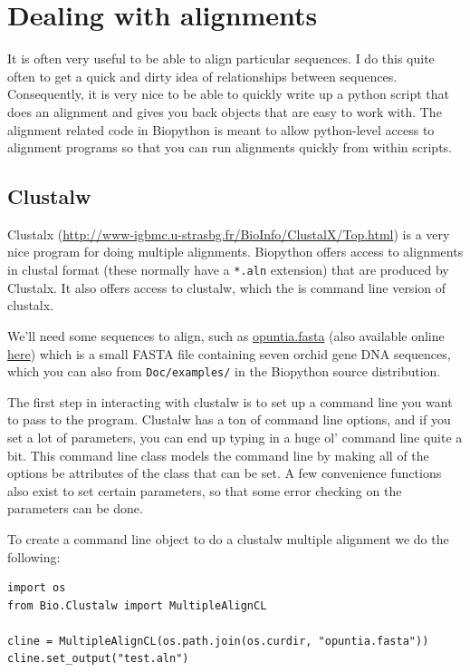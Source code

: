 \documentclass{report}
\begin{document}
\section{Dealing with alignments}

It is often very useful to be able to align particular sequences. I do this quite often to get a quick and dirty idea of relationships between sequences. Consequently, it is very nice to be able to quickly write up a python script that does an alignment and gives you back objects that are easy to work with. The alignment related code in Biopython is meant to allow python-level access to alignment programs so that you can run alignments quickly from within scripts.

\subsection{Clustalw}
\label{sec:align_clustal}

Clustalx (\url{http://www-igbmc.u-strasbg.fr/BioInfo/ClustalX/Top.html}) is a very nice program for doing multiple alignments. Biopython offers access to alignments in clustal format (these normally have a \verb|*.aln| extension) that are produced by Clustalx. It also offers access to clustalw, which the is command line version of clustalx.

We'll need some sequences to align, such as \href{examples/opuntia.fasta}{opuntia.fasta} (also available online \href{http://biopython.org/DIST/docs/tutorial/examples/opuntia.fasta}{here}) which is a small FASTA file containing seven orchid gene DNA sequences, which you can also from \verb|Doc/examples/| in the Biopython source distribution.

The first step in interacting with clustalw is to set up a command line you want to pass to the program. Clustalw has a ton of command line options, and if you set a lot of parameters, you can end up typing in a huge ol' command line quite a bit. This command line class models the command line by making all of the options be attributes of the class that can be set. A few convenience functions also exist to set certain parameters, so that some error checking on the parameters can be done.

To create a command line object to do a clustalw multiple alignment we do the following:

\begin{verbatim}
import os
from Bio.Clustalw import MultipleAlignCL

cline = MultipleAlignCL(os.path.join(os.curdir, "opuntia.fasta"))
cline.set_output("test.aln")
\end{verbatim}
\end{document}
